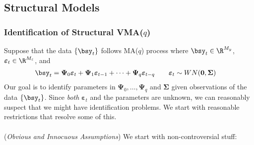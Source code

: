 \documentclass[12pt]{article}
\theoremstyle{plain}
\theoremstyle{definition}
\theoremstyle{remark}
\newcommand{\bsSigma}{\boldsymbol{\Sigma}}
\newcommand{\bsvarepsilon}{\boldsymbol{\varepsilon}}
\newcommand{\bsPsi}{\boldsymbol{\Psi}}
\renewcommand{\bso}{\boldsymbol{0}}
\begin{document}
\clearpage
\subsection{Structural Models}

\subsubsection{Identification of Structural VMA($q$)}


Suppose that the data $\{\bsy_t\}$ follows MA($q$) process where
$\bsy_t\in\R^{M_y}$, $\bsvarepsilon_t\in\R^{M_\varepsilon}$, and
\begin{align*}
  \bsy_t &=
  \bsPsi_0\bsvarepsilon_t
  +
  \bsPsi_1\bsvarepsilon_{t-1}
  +\dots+
  \bsPsi_q\bsvarepsilon_{t-q}
  \qquad \bsvarepsilon_t \sim WN(\bso,\bsSigma)
\end{align*}
Our goal is to identify parameters in $\bsPsi_0,\ldots,\bsPsi_q$ and
$\bsSigma$ given observations of the data $\{\bsy_t\}$.
Since \emph{both} $\bsvarepsilon_t$ and the parameters are unknown, we
can reasonably suspect that we might have identification problems.
We start with reasonable restrictions that resolve some of this.
\\
\\
(\emph{Obvious and Innocuous Assumptions})
We start with non-controversial stuff:
\end{document}
